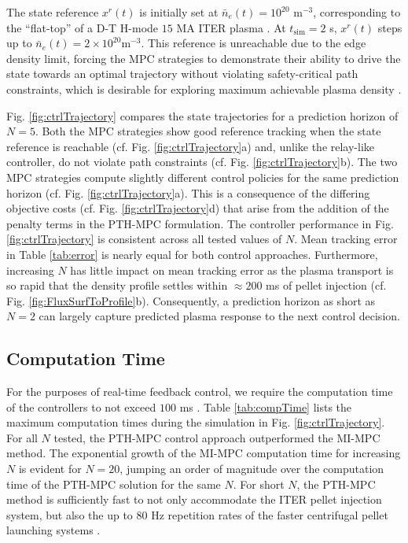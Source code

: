 \documentclass[journal,twoside,web]{ieeecolor}
\begin{document}
The state reference $x^r(t)$ is initially set at $\bar{n}_e(t) = 10^{20}$ m$^{-3}$, corresponding to the \enquote{flat-top} of a D-T H-mode $15$ MA ITER plasma \cite{Garzotti2019}. At $t_{\textrm{sim}}=2$ s,  $x^r(t)$ steps up to $\bar{n}_e(t) = 2\times 10^{20}$m$^{-3}$. This reference is unreachable due to the edge density limit, forcing the MPC strategies to demonstrate their ability to drive the state towards an optimal trajectory without violating safety-critical path constraints, which is desirable for exploring maximum achievable plasma density \cite{Lang2018}.

Fig. \ref{fig:ctrlTrajectory} compares the state trajectories for a prediction horizon of $N=5$. Both the MPC strategies show good reference tracking when the state reference is reachable (cf. Fig. \ref{fig:ctrlTrajectory}a) and, unlike the relay-like controller, do not violate path constraints (cf. Fig. \ref{fig:ctrlTrajectory}b). The two MPC strategies compute slightly different control policies for the same prediction horizon (cf. Fig. \ref{fig:ctrlTrajectory}a). This is a consequence of the differing objective costs (cf. Fig. \ref{fig:ctrlTrajectory}d) that arise from the addition of the penalty terms in the PTH-MPC formulation. The controller performance in Fig. \ref{fig:ctrlTrajectory} is consistent across all tested values of $N$. Mean tracking error in Table \ref{tab:error} is nearly equal for both control approaches. Furthermore, increasing $N$ has little impact on mean tracking error as the plasma transport is so rapid that the density profile settles within $\approx 200$ ms of pellet injection (cf. Fig. \ref{fig:FluxSurfToProfile}b). Consequently, a prediction horizon as short as $N=2$ can largely capture predicted plasma response to the next control decision. 

\subsection{Computation Time}
\label{subsec:compTime}

For the purposes of real-time feedback control, we require the computation time of the controllers to not exceed $100$ ms \cite{Baylor2016}. Table \ref{tab:compTime} lists the maximum computation times during the simulation in Fig. \ref{fig:ctrlTrajectory}. For all $N$ tested, the PTH-MPC control approach outperformed the MI-MPC method. The exponential growth of the MI-MPC computation time for increasing $N$ is evident for $N = 20$, jumping an order of magnitude over the computation time of the PTH-MPC solution for the same $N$. For short $N$, the PTH-MPC method is sufficiently fast to not only accommodate the ITER pellet injection system, but also the up to $80$ Hz repetition rates of the faster centrifugal pellet launching systems \cite{Lang2019}. 
\end{document}
